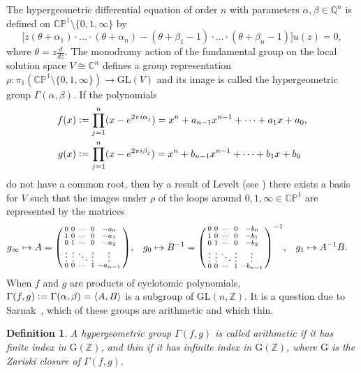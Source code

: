 \documentclass[11pt,a4paper]{amsart}
\newtheorem{defn}[thm]{Definition}
\theoremstyle{definition}
\theoremstyle{definition}
\numberwithin{equation}{section}
\begin{document}
The hypergeometric differential equation of order $n$ with parameters $\alpha,\beta\in\mathbb{Q}^n$ is defined on $\mathbb{CP}^1\setminus\{0,1,\infty\}$ by
\[
\big[z(\theta+\alpha_{1})\cdot\ldots\cdot(\theta+\alpha_{n})-(\theta+\beta_{1}-1)\cdot\ldots\cdot(\theta+\beta_{n}-1)\big]u(z)=0,
\]
where $\theta=z\frac{d}{dz}$. The monodromy action of the fundamental group on the local solution space $V\cong\mathbb{C}^n$ defines a group representation $\rho\colon\pi_1(\mathbb{CP}^1\setminus\{0,1,\infty\})\to\mathrm{GL}(V)$
and its image is called the hypergeometric group $\Gamma(\alpha,\beta)$.
If the polynomials
\begin{align*}
f(x) & \vcentcolon=\prod_{j=1}^{n}(x-e^{2\pi i\alpha_{j}})=x^n+a_{n-1}x^{n-1}+\cdots+a_1x+a_0,\\
g(x) & \vcentcolon=\prod_{j=1}^{n}(x-e^{2\pi i\beta_{j}})=x^n+b_{n-1}x^{n-1}+\cdots+b_1x+b_0
\end{align*}
do not have a common root, then by a result of Levelt (see \cite[Thm.~3.5]{BH}) there exists a basis for $V$ such that the images under $\rho$ of the loops around $0,1,\infty\in\mathbb{CP}^1$ are represented by the matrices
\begin{align}\label{eq:companion-matrices}
g_{\infty} & \mapsto A=\begin{psmallmatrix}
0&0&\cdots&0&-a_0\\1&0&\cdots&0&-a_1\\0&1&\cdots&0&-a_2\\ \vdots&\vdots&\ddots&\vdots&\vdots\\ 0&0&\cdots&1&-a_{n-1}
\end{psmallmatrix}, & g_{0} & \mapsto B^{-1}=\begin{psmallmatrix}
0&0&\cdots&0&-b_0\\1&0&\cdots&0&-b_1\\0&1&\cdots&0&-b_2\\ \vdots&\vdots&\ddots&\vdots&\vdots\\ 0&0&\cdots&1&-b_{n-1}
\end{psmallmatrix}^{-1}, & g_{1} & \mapsto A^{-1}B.
\end{align}
When $f$ and $g$ are products of cyclotomic polynomials, $\Gamma(f,g)\vcentcolon=\Gamma(\alpha,\beta)=\langle A,B\rangle$ is a subgroup of $\mathrm{GL}(n,\mathbb{Z})$.
It is a question due to Sarnak~\cite{Sa14}, which of these groups are arithmetic and which thin.

\begin{defn}
A hypergeometric group $\Gamma(f,g)$ is called arithmetic if it has finite index in $\mathrm{G}(\mathbb{Z})$, and thin if it has infinite index in $\mathrm{G}(\mathbb{Z})$, where $\mathrm{G}$ is the Zariski closure of $\Gamma(f,g)$.
\end{defn}
\end{document}
